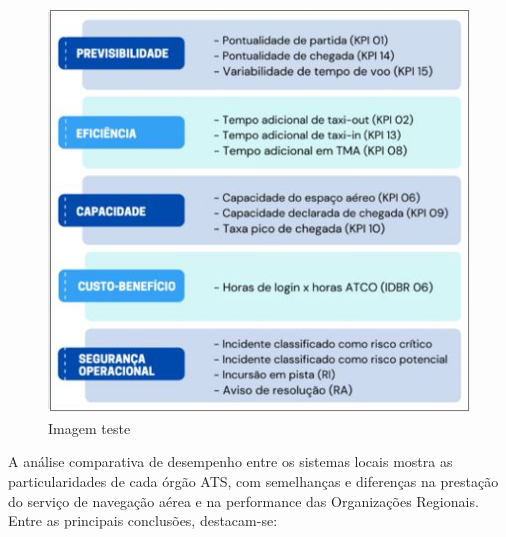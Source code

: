\documentclass[
]{book}
\begin{document}
\begin{figure}
\centering
\includegraphics{imagens/fig1.jpg}
\caption{Imagem teste}
\end{figure}

A análise comparativa de desempenho entre os sistemas locais mostra as particularidades de cada órgão ATS, com semelhanças e diferenças na prestação do serviço de navegação aérea e na performance das Organizações Regionais. Entre as principais conclusões, destacam-se:
\end{document}
